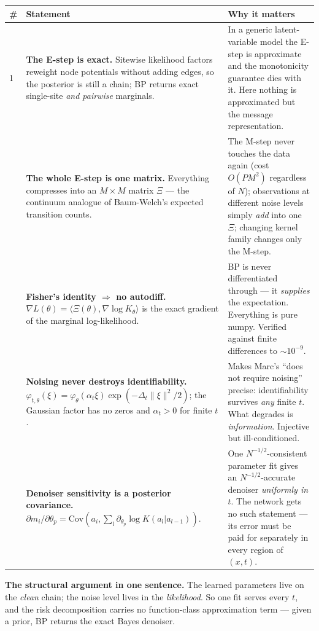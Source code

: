 \documentclass[11pt,a4paper]{article}
\begin{document}
\begin{center}
\small
\begin{tabular}{@{}p{0.5cm}p{7.2cm}p{7.3cm}@{}}
\toprule
\# & \textbf{Statement} & \textbf{Why it matters} \\
\midrule
1 & \textbf{The E-step is exact.} Sitewise likelihood factors reweight node potentials
without adding edges, so the posterior is still a chain; BP returns exact single-site
\emph{and pairwise} marginals. &
In a generic latent-variable model the E-step is approximate and the monotonicity
guarantee dies with it. Here nothing is approximated but the message representation. \\
\addlinespace
2 & \textbf{The whole E-step is one matrix.} Everything compresses into an $M\times M$
matrix $\Xi$ --- the continuum analogue of Baum-Welch's expected transition counts. &
The M-step never touches the data again (cost $O(PM^2)$ regardless of $N$); observations at
different noise levels simply \emph{add} into one $\Xi$; changing kernel family changes only
the M-step. \\
\addlinespace
3 & \textbf{Fisher's identity $\Rightarrow$ no autodiff.}
$\nabla L(\theta) = \langle \Xi(\theta), \nabla \log K_\theta\rangle$ is the exact gradient
of the marginal log-likelihood. &
BP is never differentiated through --- it \emph{supplies} the expectation. Everything is
pure numpy. Verified against finite differences to $\sim 10^{-9}$. \\
\addlinespace
4 & \textbf{Noising never destroys identifiability.}
$\varphi_{t,\theta}(\xi) = \varphi_\theta(\alpha_t\xi)\exp(-\Delta_t\|\xi\|^2/2)$; the
Gaussian factor has no zeros and $\alpha_t>0$ for finite $t$. &
Makes Marc's ``does not require noising'' precise: identifiability survives \emph{any}
finite $t$. What degrades is \emph{information}. Injective but ill-conditioned. \\
\addlinespace
5 & \textbf{Denoiser sensitivity is a posterior covariance.}
$\partial m_i/\partial\theta_p = \mathrm{Cov}(a_i, \sum_l \partial_{\theta_p}\log K(a_l|a_{l-1}))$. &
One $N^{-1/2}$-consistent parameter fit gives an $N^{-1/2}$-accurate denoiser
\emph{uniformly in $t$}. The network gets no such statement --- its error must be paid for
separately in every region of $(x,t)$. \\
\bottomrule
\end{tabular}
\end{center}

\begin{keybox}
\textbf{The structural argument in one sentence.} The learned parameters live on the
\emph{clean} chain; the noise level lives in the \emph{likelihood}. So one fit serves every
$t$, and the risk decomposition carries no function-class approximation term --- given a
prior, BP returns the exact Bayes denoiser.
\end{keybox}
\end{document}

